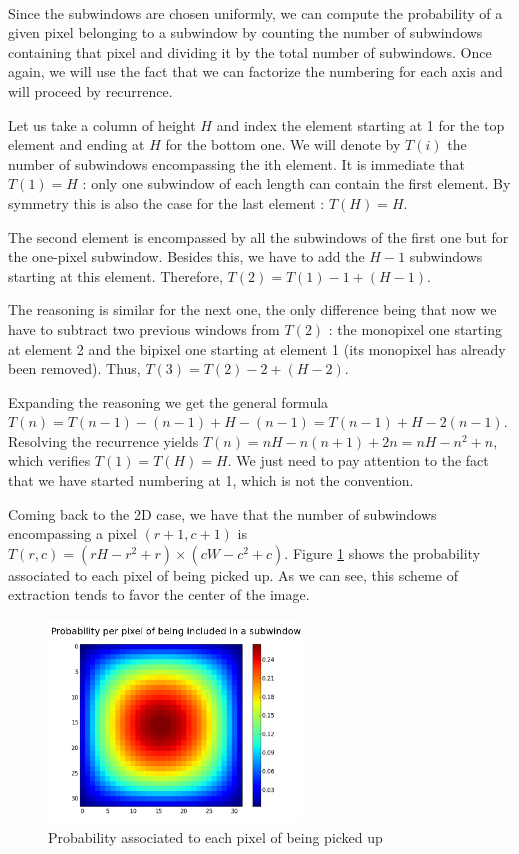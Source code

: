 \documentclass[a4paper]{report}
\begin{document}
		\paragraph{}
		Since the subwindows are chosen uniformly, we can compute the probability of a given pixel belonging to a subwindow by counting the number of subwindows containing that pixel and dividing it by the total number of subwindows. Once again, we will use the fact that we can factorize the numbering for each axis and will proceed by recurrence. 
		\par
		Let us take a column of height $H$ and index the element starting at 1 for the top element and ending at $H$ for the bottom one. We will denote by $T(i)$ the number of subwindows encompassing the ith element. It is immediate that $T(1) = H$ : only one subwindow of each length can contain the first element. By symmetry this is also the case for the last element : $T(H) = H$. 
		\par
		The second element is encompassed by all the subwindows of the first one but for the one-pixel subwindow. Besides this, we have to add the $H-1$ subwindows starting at this element. Therefore, $T(2) = T(1) - 1 + (H -1)$. 
		\par
		The reasoning is similar for the next one, the only difference being that now we have to subtract two previous windows from $T(2)$ : the monopixel one starting at element 2 and the bipixel one starting at element 1 (its monopixel has already been removed). Thus, $T(3) = T(2) - 2 + (H - 2)$. 
		\par
		Expanding the reasoning we get the general formula $T(n) = T(n-1) - (n-1) + H - (n-1) = T(n-1) + H - 2(n-1)$. Resolving the recurrence yields $T(n) = nH - n(n+1) + 2n = nH -n^2 + n$, which verifies $T(1) = T(H) = H$. We just need to pay attention to the fact that we have started numbering at 1, which is not the convention.
		\par
		Coming back to the 2D case, we have that the number of subwindows encompassing a pixel $(r+1,c+1)$ is $T(r,c) = (rH - r^2 + r) \times (cW - c^2 + c)$.
		Figure \ref{fig:probpixel} shows the probability associated to each pixel of being picked up. As we can see, this scheme of extraction tends to favor the center of the image.
		
	\begin{figure}
		\centering
			\includegraphics[width=0.6\textwidth]{images/probpixel.png}
		\caption{\label{fig:probpixel}Probability associated to each pixel of being picked up}
	\end{figure}
		
\end{document}
